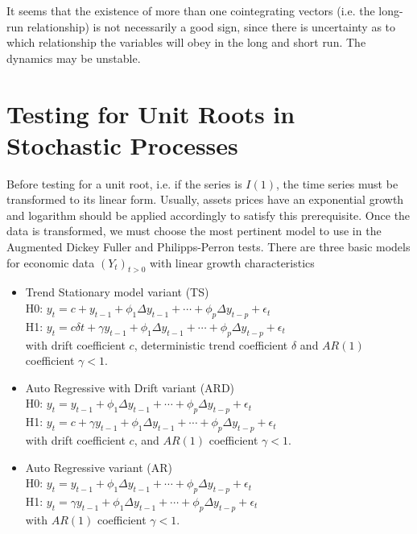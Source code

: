 \documentclass[11pt,a4,twosided,singlespacing,titlepagenumber=on]{scrreprt}
\numberwithin{equation}{chapter} %
\theoremstyle{remark}
\begin{document}
It seems that the existence of more than one cointegrating vectors (i.e. the long-run relationship) is not necessarily a good sign, since there is uncertainty as to which relationship the variables will obey in the long and short run. The dynamics may be unstable.

\section{Testing for Unit Roots in Stochastic Processes}

Before testing for a unit root, i.e. if the series is $I(1)$, the time series must be transformed to its linear form. Usually, assets prices have an exponential growth and logarithm should be applied accordingly to satisfy this prerequisite. Once the data is transformed, we must choose the most pertinent model to use in the Augmented Dickey Fuller and Philipps-Perron tests. There are three basic models for economic data $(Y_t)_{t>0}$ with linear growth characteristics
\begin{itemize}
\item Trend Stationary model variant (TS) \\
H0: $y_t = c + y_{t-1} + \phi_1 \Delta y_{t-1} + \cdots + \phi_p \Delta y_{t-p} + \epsilon_t $ \\
H1: $y_t = c \delta t + \gamma y_{t-1} + \phi_1 \Delta y_{t-1} + \cdots + \phi_p \Delta y_{t-p} + \epsilon_t $ \\
with drift coefficient $c$, deterministic trend coefficient $\delta$ and $AR(1)$ coefficient $\gamma <1$.
\item Auto Regressive with Drift variant (ARD) \\
H0: $y_t = y_{t-1} + \phi_1 \Delta y_{t-1} + \cdots + \phi_p \Delta y_{t-p} + \epsilon_t $ \\
H1: $y_t = c + \gamma y_{t-1} + \phi_1 \Delta y_{t-1} + \cdots + \phi_p \Delta y_{t-p} + \epsilon_t $ \\
with drift coefficient $c$, and $AR(1)$ coefficient $\gamma <1$.
\item Auto Regressive variant (AR) \\
H0: $y_t = y_{t-1} + \phi_1 \Delta y_{t-1} + \cdots + \phi_p \Delta y_{t-p} + \epsilon_t $ \\
H1: $y_t = \gamma y_{t-1} + \phi_1 \Delta y_{t-1} + \cdots + \phi_p \Delta y_{t-p} + \epsilon_t $ \\
with $AR(1)$ coefficient $\gamma <1$.
\end{itemize}
\end{document}
